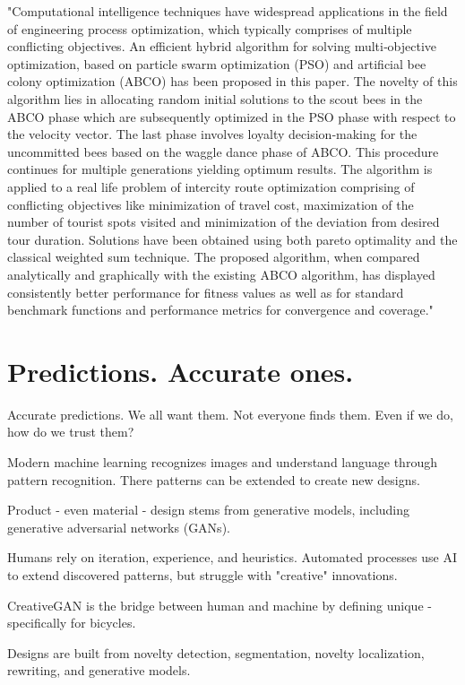 \documentclass[a4paper,11pt]{article}
\begin{document}
"Computational intelligence techniques have widespread applications in the field of engineering process optimization, which typically comprises of multiple conflicting objectives. An efficient hybrid algorithm for solving multi‐objective optimization, based on particle swarm optimization (PSO) and artificial bee colony optimization (ABCO) has been proposed in this paper. The novelty of this algorithm lies in allocating random initial solutions to the scout bees in the ABCO phase which are subsequently optimized in the PSO phase with respect to the velocity vector. The last phase involves loyalty decision‐making for the uncommitted bees based on the waggle dance phase of ABCO. This procedure continues for multiple generations yielding optimum results. The algorithm is applied to a real life problem of intercity route optimization comprising of conflicting objectives like minimization of travel cost, maximization of the number of tourist spots visited and minimization of the deviation from desired tour duration. Solutions have been obtained using both pareto optimality and the classical weighted sum technique. The proposed algorithm, when compared analytically and graphically with the existing ABCO algorithm, has displayed consistently better performance for fitness values as well as for standard benchmark functions and performance metrics for convergence and coverage."\cite{beed2020hybrid}

\section{Predictions. Accurate ones.}

Accurate predictions. We all want them. Not everyone finds them. Even if we do, how do we trust them? 

Modern machine learning recognizes images and understand language through pattern recognition. There patterns can be extended to create new designs. 

Product - even material - design stems from generative models, including generative adversarial networks (GANs).

Humans rely on iteration, experience, and heuristics. Automated processes use AI to extend discovered patterns, but struggle with "creative" innovations. 

 CreativeGAN is the bridge between human and machine by defining unique - specifically for bicycles.

Designs are built from novelty detection, segmentation, novelty localization, rewriting, and generative models. \cite{nobari2021creativegan}
\end{document}
